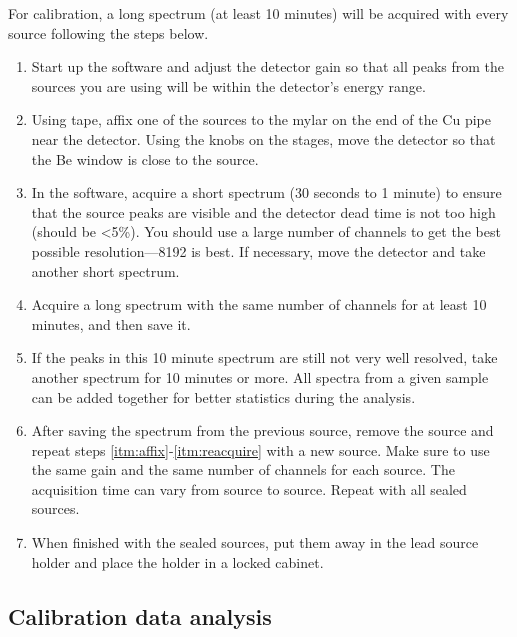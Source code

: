 For calibration, a long spectrum (at least 10 minutes) will be
acquired with every source following the steps below.
\begin{enumerate}
\item Start up the software and adjust the detector gain so that all
  peaks from the sources you are using will be within the detector's
  energy range.
\item \label{itm:affix} Using tape, affix one of the sources to the
  mylar on the end of the Cu pipe near the detector. Using the knobs
  on the stages, move the detector so that the Be window is close to
  the source.
\item In the software, acquire a short spectrum (30 seconds to 1 minute) to
  ensure that the source peaks are visible and the detector dead time is not too
  high (should be <5\%). You should use a large number of channels to get the
  best possible resolution---8192 is best. If necessary, move the detector and
  take another short spectrum.
\item \label{itm:acquire} Acquire a long spectrum with the same number of
  channels for at least 10 minutes, and then save it.
\item \label{itm:reacquire} If the peaks in this 10 minute spectrum
  are still not very well resolved, take another spectrum for 10
  minutes or more. All spectra from a given sample can be added
  together for better statistics during the analysis.
\item After saving the spectrum from the previous source, remove the
  source and repeat steps \ref{itm:affix}-\ref{itm:reacquire} with a new
  source. Make sure to use the same gain and the same number of
  channels for each source. The acquisition time can vary from source
  to source. Repeat with all sealed sources.
\item When finished with the sealed sources, put them away in the lead
  source holder and place the holder in a locked cabinet.
\end{enumerate}
  
\subsection{Calibration data analysis}


